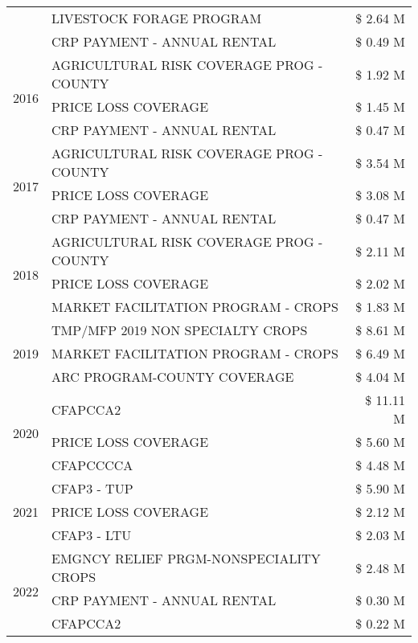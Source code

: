 \begin{tabular}{llr}
 & LIVESTOCK FORAGE PROGRAM & \$ 2.64 M \\
 & CRP PAYMENT - ANNUAL RENTAL & \$ 0.49 M \\
\cline{1-3}
\multirow[t]{3}{*}{2016} & AGRICULTURAL RISK COVERAGE PROG - COUNTY & \$ 1.92 M \\
 & PRICE LOSS COVERAGE & \$ 1.45 M \\
 & CRP PAYMENT - ANNUAL RENTAL & \$ 0.47 M \\
\cline{1-3}
\multirow[t]{3}{*}{2017} & AGRICULTURAL RISK COVERAGE PROG - COUNTY & \$ 3.54 M \\
 & PRICE LOSS COVERAGE & \$ 3.08 M \\
 & CRP PAYMENT - ANNUAL RENTAL & \$ 0.47 M \\
\cline{1-3}
\multirow[t]{3}{*}{2018} & AGRICULTURAL RISK COVERAGE PROG - COUNTY & \$ 2.11 M \\
 & PRICE LOSS COVERAGE & \$ 2.02 M \\
 & MARKET FACILITATION PROGRAM - CROPS & \$ 1.83 M \\
\cline{1-3}
\multirow[t]{3}{*}{2019} & TMP/MFP 2019 NON SPECIALTY CROPS & \$ 8.61 M \\
 & MARKET FACILITATION PROGRAM - CROPS & \$ 6.49 M \\
 & ARC PROGRAM-COUNTY COVERAGE & \$ 4.04 M \\
\cline{1-3}
\multirow[t]{3}{*}{2020} & CFAPCCA2 & \$ 11.11 M \\
 & PRICE LOSS COVERAGE & \$ 5.60 M \\
 & CFAPCCCCA & \$ 4.48 M \\
\cline{1-3}
\multirow[t]{3}{*}{2021} & CFAP3 - TUP & \$ 5.90 M \\
 & PRICE LOSS COVERAGE & \$ 2.12 M \\
 & CFAP3 - LTU & \$ 2.03 M \\
\cline{1-3}
\multirow[t]{3}{*}{2022} & EMGNCY RELIEF PRGM-NONSPECIALITY CROPS & \$ 2.48 M \\
 & CRP PAYMENT - ANNUAL RENTAL & \$ 0.30 M \\
 & CFAPCCA2 & \$ 0.22 M \\
\cline{1-3}
\bottomrule
\end{tabular}
